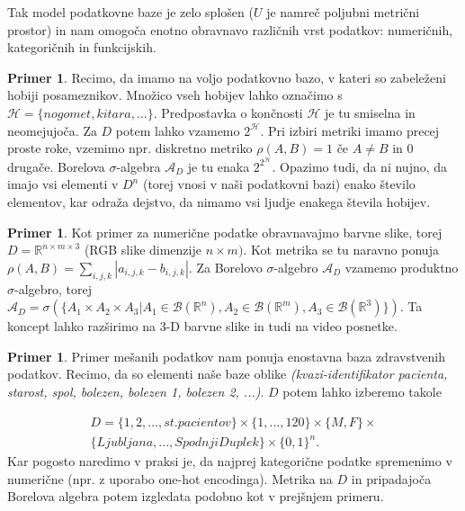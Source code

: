 \documentclass[12pt,a4paper]{amsart}
\theoremstyle{definition} %
\newtheorem{primer}[definicija]{Primer}
\theoremstyle{plain} %
\begin{document}
\newline
\newline
Tak model podatkovne baze je zelo splošen ($U$ je namreč poljubni metrični prostor) in nam omogoča enotno obravnavo različnih vrst podatkov: numeričnih, kategoričnih in funkcijskih.
\begin{primer}  
Recimo, da imamo na voljo podatkovno bazo, v kateri so zabeleženi hobiji posameznikov. Množico vseh hobijev lahko označimo s $\mathcal{H}=\{nogomet, kitara,...\}$. Predpostavka o končnosti $\mathcal{H}$ je tu smiselna in neomejujoča. Za $D$ potem lahko vzamemo $2^\mathcal{H}$. Pri izbiri metriki imamo precej proste roke, vzemimo npr. diskretno metriko  $\rho(A,B)=1$ če $A \neq B$ in 0 drugače. Borelova $\sigma$-algebra $\mathcal{A}_{D}$ je tu enaka $2^{2^{\mathcal{H}}}$. Opazimo tudi, da ni nujno, da imajo vsi elementi v $D^n$ (torej vnosi v naši podatkovni bazi) enako število elementov, kar odraža dejstvo, da nimamo vsi ljudje enakega števila hobijev.
\end{primer}

\begin{primer} Kot primer za numerične podatke obravnavajmo barvne slike, torej $D = \mathbb{R}^{n\times m \times 3}$ (RGB slike dimenzije $n \times m)$. Kot metrika se tu naravno ponuja $\rho(A,B)=\sum_{i,j,k}  |a_{i,j,k}-b_{i,j,k}|$. Za Borelovo $\sigma$-algebro $\mathcal{A}_{D}$  vzamemo produktno $\sigma$-algebro, torej  $\mathcal{A}_{D}=\sigma(\{A_{1} \times A_{2} \times A_{3} | A_{1} \in \mathcal{B}(\mathbb{R}^n),  A_{2} \in \mathcal{B}(\mathbb{R}^m),  A_{3} \in \mathcal{B}(\mathbb{R}^3) \})$. Ta koncept lahko razširimo na 3-D barvne slike in tudi na video posnetke.
\end{primer}

\begin{primer} Primer mešanih podatkov nam ponuja enostavna baza zdravstvenih podatkov. Recimo, da so elementi naše baze oblike \textit{(kvazi-identifikator pacienta, starost, spol, bolezen, bolezen 1, bolezen 2, ...)}. $D$ potem lahko izberemo takole 

\begin{gather*}
D=\{1,2,...,st. pacientov\} \times \{1,...,120\} \times \{M,F\} \times \\
\{Ljubljana, ... , Spodnji Duplek\} \times \{0,1\}^n.
\end{gather*}
Kar pogosto naredimo v praksi je, da najprej kategorične podatke spremenimo v numerične (npr. z uporabo one-hot encodinga). Metrika na $D$ in pripadajoča Borelova algebra potem izgledata podobno kot v prejšnjem primeru.
\end{primer}
\end{document}
